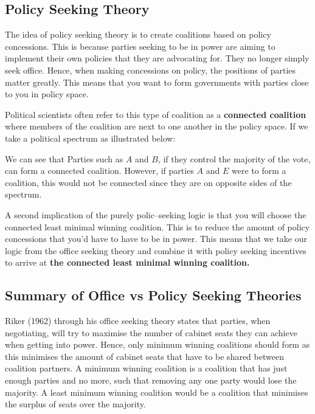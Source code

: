 \documentclass[12pt, letterpaper]{article}
\begin{document}
\subsection{Policy Seeking Theory}
The idea of policy seeking theory is to create coalitions based on policy concessions. This is because parties seeking to be in power are aiming to implement their own policies that they are advocating for. They no longer simply seek office. Hence, when making concessions on policy, the positions of parties matter greatly. This means that you want to form governments with parties close to you in policy space. 

Political scientists often refer to this type of coalition as a \textbf{connected coalition} where members of the coalition are next to one another in the policy space. If we take a political spectrum as illustrated below:
\begin{center}
\end{center}

We can see that Parties such as $A$ and $B$, if they control the majority of the vote, can form a connected coalition. However, if parties $A$ and $E$ were to form a coalition, this would not be connected since they are on opposite sides of the spectrum.

A second implication of the purely polic--seeking logic is that you will choose the connected least minimal winning coalition. This is to reduce the amount of policy concessions that you'd have to have to be in power. This means that we take our logic from the office seeking theory and combine it with policy seeking incentives to arrive at \textbf{the connected least minimal winning coalition.}

\subsection{Summary of Office vs Policy Seeking Theories}
Riker (1962) through his office seeking theory states that parties, when negotiating, will try to maximise the number of cabinet seats they can achieve when getting into power. Hence, only minimum winning coalitions should form as this minimises the amount of cabinet seats that have to be shared between coalition partners. A minimum winning coalition is a coalition that has just enough parties and no more, such that removing any one party would lose the majority. A least minimum winning coalition would be a coalition that minimises the surplus of seats over the majority.
\end{document}
